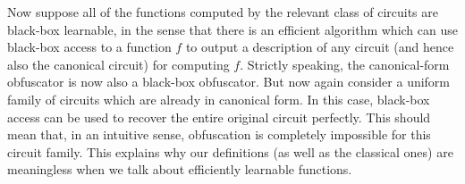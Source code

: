 \documentclass[11pt]{article}
\numberwithin{equation}{section}
\begin{document}
Now suppose all of the functions computed by the relevant class of circuits are black-box learnable, in the sense that there is an efficient algorithm which can use black-box access to a function $f$ to output a description of any circuit (and hence also the canonical circuit) for computing $f$. Strictly speaking, the canonical-form obfuscator is now also a black-box obfuscator. But now again consider a uniform family of circuits which are already in canonical form. In this case, black-box access can be used to recover the entire original circuit perfectly. This should mean that, in an intuitive sense, obfuscation is completely impossible for this circuit family. This explains why our definitions (as well as the classical ones) are meaningless when we talk about efficiently learnable functions.
\end{document}
